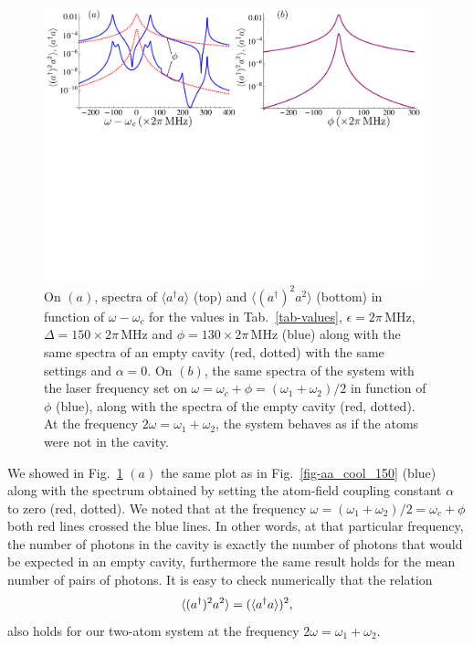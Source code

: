 \begin{figure}
\center
\includegraphics[width=\textwidth]{Images/chap5/transparency.pdf}
\caption[ $\langle a^\dagger a \rangle$ and $\langle (a^\dagger)^2 a^2 \rangle$ in function of $\omega-\omega_c$ ]{On $(a)$, spectra of $\langle a^\dagger a \rangle$ (top) and $\langle (a^\dagger)^2 a^2 \rangle$ (bottom) in function of $\omega-\omega_c$ for the values in Tab.~\ref{tab-values}, $\epsilon= 2\pi\,\mbox{MHz}$, $\Delta=150\times 2\pi\,\mbox{MHz}$ and $\phi=130\times 2\pi\,\mbox{MHz}$ (blue) along with the same spectra of an empty cavity (red, dotted) with the same settings and $\alpha=0$. On $(b)$, the same spectra of the system with the laser frequency set on $\omega = \omega_c + \phi = (\omega_1+\omega_2)/2$  in function of $\phi$ (blue), along with the spectra of the empty cavity (red, dotted). At the frequency $2\omega= \omega_1+\omega_2$, the system behaves as if the atoms were not in the cavity. }
\label{fig-transparency}
\end{figure}

We showed in Fig.~\ref{fig-transparency} $(a)$ the same plot as in Fig.~\ref{fig-aa_cool_150} (blue) along with the spectrum obtained by setting the atom-field coupling constant $\alpha$ to zero (red, dotted). We noted that at the frequency $\omega= (\omega_1+\omega_2)/2=\omega_c+\phi$ both red lines crossed the blue lines. In other words, at that particular frequency, the number of photons in the cavity is exactly the number of photons that would be expected in an empty cavity, furthermore the same result holds for the mean number of pairs of photons. It is easy to check numerically that the relation
\[\langle (a^\dagger)^2 a^2 \rangle=(\langle a^\dagger a \rangle)^2,\]
also holds for our two-atom system at the frequency $2\omega= \omega_1+\omega_2$.

